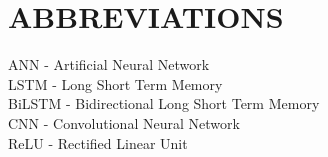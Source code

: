 \chapter*{ABBREVIATIONS}							%


\noindent ANN - Artificial Neural Network \\
LSTM - Long Short Term Memory \\
BiLSTM - Bidirectional Long Short Term Memory \\
CNN - Convolutional Neural Network \\
ReLU - Rectified Linear Unit \\

